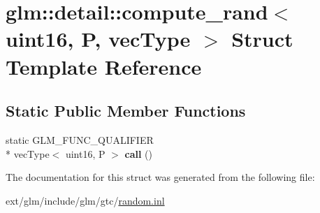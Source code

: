 \hypertarget{structglm_1_1detail_1_1compute__rand_3_01uint16_00_01_p_00_01vec_type_01_4}{\section{glm\-:\-:detail\-:\-:compute\-\_\-rand$<$ uint16, P, vec\-Type $>$ Struct Template Reference}
\label{structglm_1_1detail_1_1compute__rand_3_01uint16_00_01_p_00_01vec_type_01_4}
}
\subsection*{Static Public Member Functions}
\begin{DoxyCompactItemize}
\item 
\hypertarget{structglm_1_1detail_1_1compute__rand_3_01uint16_00_01_p_00_01vec_type_01_4_ae07d663b72169f25cbd1235917acbff8}{static G\-L\-M\-\_\-\-F\-U\-N\-C\-\_\-\-Q\-U\-A\-L\-I\-F\-I\-E\-R \\*
vec\-Type$<$ uint16, P $>$ {\bfseries call} ()}\label{structglm_1_1detail_1_1compute__rand_3_01uint16_00_01_p_00_01vec_type_01_4_ae07d663b72169f25cbd1235917acbff8}

\end{DoxyCompactItemize}


The documentation for this struct was generated from the following file\-:\begin{DoxyCompactItemize}
\item 
ext/glm/include/glm/gtc/\hyperlink{random_8inl}{random.\-inl}\end{DoxyCompactItemize}
